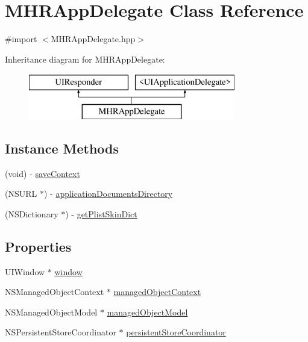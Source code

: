 \hypertarget{interface_m_h_r_app_delegate}{\section{M\+H\+R\+App\+Delegate Class Reference}
\label{interface_m_h_r_app_delegate}
}


{\ttfamily \#import $<$M\+H\+R\+App\+Delegate.\+hpp$>$}

Inheritance diagram for M\+H\+R\+App\+Delegate\+:\begin{figure}[H]
\begin{center}
\leavevmode
\includegraphics[height=2.000000cm]{interface_m_h_r_app_delegate}
\end{center}
\end{figure}
\subsection*{Instance Methods}
\begin{DoxyCompactItemize}
\item 
(void) -\/ \hyperlink{interface_m_h_r_app_delegate_aec18685dadaebd97aa02780c3f43c5c1}{save\+Context}
\item 
(N\+S\+U\+R\+L $\ast$) -\/ \hyperlink{interface_m_h_r_app_delegate_a7f18dc9ee3d899f8b4661b48734f1001}{application\+Documents\+Directory}
\item 
(N\+S\+Dictionary $\ast$) -\/ \hyperlink{interface_m_h_r_app_delegate_ac246805d8cd3d8477430f1a9c7fefbac}{get\+Plist\+Skin\+Dict}
\end{DoxyCompactItemize}
\subsection*{Properties}
\begin{DoxyCompactItemize}
\item 
U\+I\+Window $\ast$ \hyperlink{interface_m_h_r_app_delegate_ae07fbc2242a8ac6a6cca11d22a56dede}{window}
\item 
N\+S\+Managed\+Object\+Context $\ast$ \hyperlink{interface_m_h_r_app_delegate_a798999c986183b6b0f61070b46856713}{managed\+Object\+Context}
\item 
N\+S\+Managed\+Object\+Model $\ast$ \hyperlink{interface_m_h_r_app_delegate_ab0f79ebe18e402e0249870b98354612b}{managed\+Object\+Model}
\item 
N\+S\+Persistent\+Store\+Coordinator $\ast$ \hyperlink{interface_m_h_r_app_delegate_ade32c3c30bed3706907d1a52c129da79}{persistent\+Store\+Coordinator}
\end{DoxyCompactItemize}


